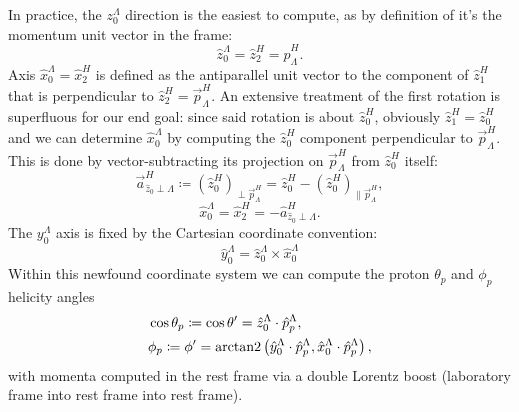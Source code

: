 In practice, the $z_0^\Lambda$ direction is the easiest to compute, as by definition of \slambda it's the \lbz momentum unit vector in the \shad frame:
\begin{equation}
	\hat{z}_0^\Lambda = \hat{z}_2^H = \hat{p}_\Lambda^H.
\end{equation}
%
Axis $\hat{x}_0^\Lambda = \hat{x}_2^H$ is defined as the antiparallel unit vector to the component of $\hat{z}_1^H$ that is perpendicular to $\hat{z}_2^H = \vec{p}_\Lambda^H$.
An extensive treatment of the first rotation is superfluous for our end goal:
since said rotation is about $\hat{z}_0^H$, obviously $\hat{z}_1^H = \hat{z}_0^H$ and we can determine $\hat{x}_0^\Lambda$ by computing the $\hat{z}_0^H$ component perpendicular to
$\vec{p}_\Lambda^H$.
This is done by vector-subtracting its projection on $\vec{p}_\Lambda^H$ from $\hat{z}_0^H$ itself:
\begin{equation}
	\vec{a}^H_{\hat{z}_0 \perp \Lambda}
	\coloneqq
	\left(\hat{z}_0^H\right)_{\perp \vec{p}_\Lambda^H}
	=
	\hat{z}_0^H - \left(\hat{z}_0^H\right)_{\parallel \vec{p}_\Lambda^H},
\end{equation}
\begin{equation}
	\hat{x}_0^\Lambda = \hat{x}_2^H
	=
	- \hat{a}^H_{\hat{z}_0 \perp \Lambda}.
\end{equation}
The $y_0^\Lambda$ axis is fixed by the Cartesian coordinate convention:
\begin{equation}
	\hat{y}_0^\Lambda = \hat{z}_0^\Lambda \times \hat{x}_0^\Lambda
\end{equation}
Within this newfound coordinate system we can compute the proton $\theta_p$ and $\phi_p$ helicity angles
\begin{subequations}
	\label{eq:5:helicity_angles}
	\begin{align}
		&\cos\theta_p \coloneqq \cos\theta'
		=
		\hat{z}_0^\Lambda \cdot \hat{p}_p^\Lambda,
		\label{eq:5:helicity_theta} \\
		&\phi_p \coloneqq \phi'
		=
		\operatorname{arctan2}
		\left(
			\hat{y}_0^\Lambda \cdot \hat{p}_p^\Lambda,
			\hat{x}_0^\Lambda \cdot \hat{p}_p^\Lambda
		\right),
		\label{eq:5:helicity_phi}
	\end{align}
\end{subequations}
with momenta computed in the \lz rest frame via a double Lorentz boost (laboratory frame into \lbz rest frame into \lz rest frame).

